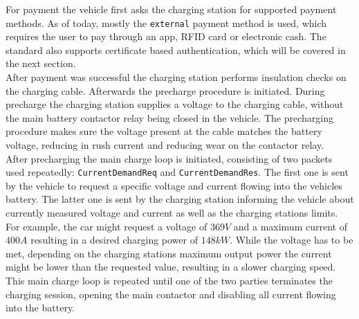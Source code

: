 \documentclass[conference,flushend]{iaria} %
\begin{document}
For payment the vehicle first asks the charging station for supported payment methods.
As of today, mostly the \verb'external' payment method is used, which requires the user to pay through an app, RFID card or electronic cash.
The standard also supports certificate based authentication, which will be covered in the next section. \\
After payment was successful the charging station performs insulation checks on the charging cable.
Afterwards the precharge procedure is initiated.
During precharge the charging station supplies a voltage to the charging cable, without the main battery contactor relay being closed in the vehicle.
The precharging procedure makes sure the voltage present at the cable matches the battery voltage, reducing in rush current and reducing wear on the contactor relay. \\
After precharging the main charge loop is initiated, consisting of two packets used repeatedly: \verb'CurrentDemandReq' and \verb'CurrentDemandRes'.
The first one is sent by the vehicle to request a specific voltage and current flowing into the vehicles battery.
The latter one is sent by the charging station informing the vehicle about currently measured voltage and current as well as the charging stations limits.
For example, the car might request a voltage of $369V$ and a maximum current of $400A$ resulting in a desired charging power of $148kW$.
While the voltage has to be met, depending on the charging stations maximum output power the current might be lower than the requested value, resulting in a slower charging speed. \\
This main charge loop is repeated until one of the two parties terminates the charging session, opening the main contactor and disabling all current flowing into the battery.
\end{document}
